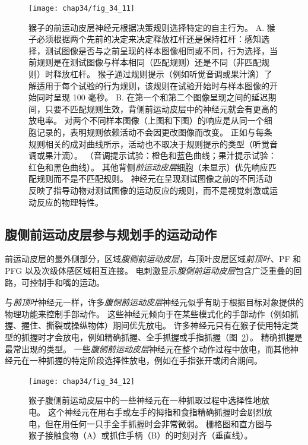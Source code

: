 \begin{figure}[htbp]
	\centering
	\texttt{[image: chap34/fig\_34\_11]}
	\caption{猴子的前运动皮层神经元根据决策规则选择特定的自主行为\cite{wallis2003rule}。
		A. 猴子必须根据两个先前的决定来决定释放杠杆还是保持杠杆：感知选择，测试图像是否与之前呈现的样本图像相同或不同，行为选择，当前规则是在测试图像与样本相同（匹配规则）还是不同（非匹配规则）时释放杠杆。
		猴子通过规则提示（例如听觉音调或果汁滴）了解适用于每个试验的行为规则，该规则在试验开始时与样本图像的开始同时呈现 100 毫秒。
		B. 在第一个和第二个图像呈现之间的延迟期间，只要不匹配规则生效，背侧前运动皮层中的神经元就会有更高的放电率。
		对两个不同样本图像（上图和下图）的响应是从同一个细胞记录的，表明规则依赖活动不会因更改图像而改变。
		正如与每条规则相关的成对曲线所示，活动也不取决于规则提示的类型（听觉音调或果汁滴）。
		（音调提示试验：橙色和蓝色曲线；果汁提示试验：红色和黑色曲线）。
		其他背侧\textit{前运动皮层}细胞（未显示）优先响应匹配规则而不是不匹配规则。
		神经元在呈现测试图像之前的不同活动反映了指导动物对测试图像的运动反应的规则，而不是视觉刺激或运动反应的物理特性。}
	\label{fig:34_11}
\end{figure}



\subsection{腹侧前运动皮层参与规划手的运动动作}

前运动皮层的最外侧部分，区域\textit{腹侧前运动皮层}，与顶叶皮层区域\textit{前顶叶}、PF 和 PFG 以及次级体感区域相互连接。
电刺激显示\textit{腹侧前运动皮层}包含广泛重叠的回路，可控制手和嘴的运动。


与\textit{前顶叶}神经元一样，许多\textit{腹侧前运动皮层}神经元似乎有助于根据目标对象提供的物理功能来控制手部动作。
这些神经元倾向于在某些模式化的手部动作（例如抓握、握住、撕裂或操纵物体）期间优先放电。
许多神经元只有在猴子使用特定类型的抓握时才会放电，例如精确抓握、全手抓握或手指抓握（图~\ref{fig:34_12}）。
精确抓握是最常出现的类型。
一些\textit{腹侧前运动皮层}神经元在整个动作过程中放电，而其他神经元在一种抓握的特定阶段选择性放电，例如在手指张开或闭合期间。


\begin{figure}[htbp]
	\centering
	\texttt{[image: chap34/fig\_34\_12]}
	\caption{猴子腹侧前运动皮层中的一些神经元在一种抓取过程中选择性地放电。
		这个神经元在用右手或左手的拇指和食指精确抓握时会剧烈放电，但在用任何一只手全手抓握时会非常微弱。
		栅格图和直方图与猴子接触食物（A）或抓住手柄（B）的时刻对齐（垂直线）。}
	\label{fig:34_12}
\end{figure}


